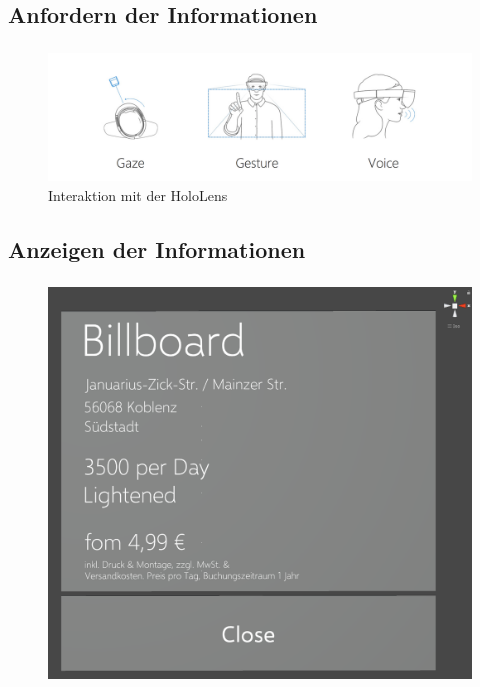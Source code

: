 \documentclass{beamer}
\begin{document}
\subsection{Anfordern der Informationen}
\begin{frame}
    \frametitle{\insertsubsection}
    \begin{figure}
        \centering
        \includegraphics[width=\linewidth]{images/Interaction}
        \caption{Interaktion mit der HoloLens~\cite{HoloLensInteraction:IaH8RfEh}}
    \end{figure}

\end{frame}

\subsection{Anzeigen der Informationen}
\begin{frame}
    \frametitle{\insertsubsection}
    \begin{figure}
        \centering
        \includegraphics[width=.6\linewidth]{images/DetailWindowInUnity}
    \end{figure}
\end{frame}
\end{document}
